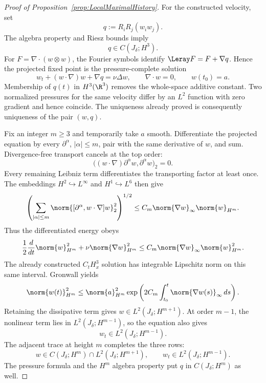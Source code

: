 \begin{proof}[Proof of Proposition~\ref{prop:LocalMaximalHistory}]

For the constructed velocity, set
\begin{equation}
  q:=R_iR_j(w_iw_j).
  \label{eq:LocalPressureFormula}
\end{equation}
The algebra property and Riesz bounds imply
\[
  q\in C(J_\delta;H^3).
\]
For \(F=\nabla\!\cdot(w\otimes w)\), the Fourier symbols identify
\(\Leray F=F+\nabla q\).  Hence the projected fixed point is the
pressure-complete solution
\[
  w_t+(w\cdot\nabla)w+\nabla q=\nu\Delta w,
  \qquad
  \nabla\cdot w=0,
  \qquad
  w(t_0)=a.
\]
Membership of \(q(t)\) in \(H^3(\R^3)\) removes the whole-space additive
constant.  Two normalized pressures for the same velocity differ by an
\(L^2\) function with zero gradient and hence coincide.  The uniqueness
already proved is consequently uniqueness of the pair \((w,q)\).


Fix an integer \(m\geq3\) and temporarily take \(a\) smooth.  Differentiate the
projected equation by every \(\partial^\alpha\), \(|\alpha|\leq m\), pair with
the same derivative of \(w\), and sum.  Divergence-free transport cancels at the
top order:
\[
  \bigl((w\cdot\nabla)\partial^\alpha w,\partial^\alpha w\bigr)_2=0.
\]
Every remaining Leibniz term differentiates the transporting factor at least
once.  The embeddings \(H^2\hookrightarrow L^\infty\) and
\(H^1\hookrightarrow L^6\) then give
\[
  \left(
  \sum_{|\alpha|\leq m}
  \norm{[\partial^\alpha,w\cdot\nabla]w}_2^2
  \right)^{1/2}
  \leq C_m\norm{\nabla w}_\infty\norm{w}_{H^m}.
\]
Thus the differentiated energy obeys
\begin{equation}
  \frac12\frac d{dt}\norm{w}_{H^m}^2
  +\nu\norm{\nabla w}_{H^m}^2
  \leq C_m\norm{\nabla w}_\infty\norm{w}_{H^m}^2.
  \label{eq:LocalPersistenceEnergy}
\end{equation}
The already constructed \(C_tH^3_x\) solution has integrable Lipschitz norm on
this same interval.  Gronwall yields
\begin{equation}
  \norm{w(t)}_{H^m}^2
  \leq
  \norm{a}_{H^m}^2
  \exp\left(
    2C_m\int_{t_0}^{t}\norm{\nabla w(s)}_\infty\,ds
  \right).
  \label{eq:LocalPersistenceBound}
\end{equation}
Retaining the dissipative term gives \(w\in L^2(J_\delta;H^{m+1})\).  At order
\(m-1\), the nonlinear term lies in \(L^2(J_\delta;H^{m-1})\), so the equation
also gives
\[
  w_t\in L^2(J_\delta;H^{m-1}).
\]
The adjacent trace at height \(m\) completes the three rows:
\begin{equation}
  w\in C(J_\delta;H^m)
  \cap L^2(J_\delta;H^{m+1}),
  \qquad
  w_t\in L^2(J_\delta;H^{m-1}).
  \label{eq:LocalHigherPersistence}
\end{equation}
The pressure formula and the \(H^m\) algebra property put
\(q\) in \(C(J_\delta;H^m)\) as well.


\end{proof}
